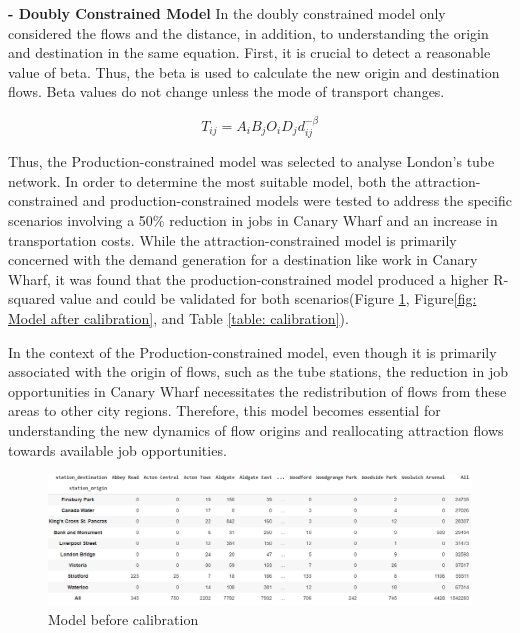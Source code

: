 \documentclass[10pt]{report}
\numberwithin{figure}{section}
\numberwithin{table}{section}
\begin{document}
\vspace{5mm} %
\textbf{- Doubly Constrained Model}
 In the doubly constrained model only considered the flows and the distance, in addition, to understanding the origin and destination in the same equation. First, it is crucial to detect a reasonable value of beta. Thus, the beta is used to calculate the new origin and destination flows. Beta values do not change unless the mode of transport changes. 

\begin{equation} \tag{4}
T_{ij} = A_i B_j O_i D_j d_{ij}^{-\beta}
\end{equation}

\newpage 

Thus, the Production-constrained model was selected to analyse London's tube network. In order to determine the most suitable model, both the attraction-constrained and production-constrained models were tested to address the specific scenarios involving a 50\% reduction in jobs in Canary Wharf and an increase in transportation costs\cite{flowerdew_fitting_2010}. While the attraction-constrained model is primarily concerned with the demand generation for a destination like work in Canary Wharf, it was found that the production-constrained model produced a higher R-squared value and could be validated for both scenarios(Figure \ref{fig: Model before calibration}, Figure\ref{fig: Model after calibration}, and Table \ref{table: calibration}).

In the context of the Production-constrained model\cite{pooler_extended_1994}, even though it is primarily associated with the origin of flows, such as the tube stations, the reduction in job opportunities in Canary Wharf necessitates the redistribution of flows from these areas to other city regions. Therefore, this model becomes essential for understanding the new dynamics of flow origins and reallocating attraction flows towards available job opportunities.

    \begin{figure}[htp]
        \centering
        \includegraphics[width=16cm]{Image/Part2_OD.png}
        \caption{Model before calibration}
        \label{fig: Model before calibration}
    \end{figure}
\end{document}
